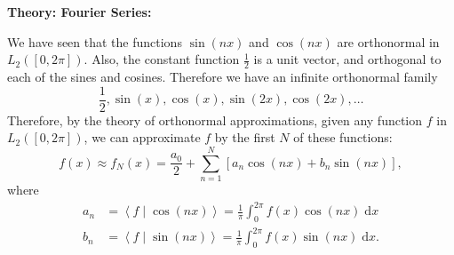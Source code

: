 \documentclass{article}
\newcommand{\diff}{\;\mathrm{d}}
\newcommand{\braket}[2]{\left\langle #1 \mid #2 \right\rangle}
\begin{document}
\begin{center}
\end{center}






\clearpage















\textbf{Theory: Fourier Series:}

\bigskip



We have seen that the functions $\sin(nx)$ and $\cos(nx)$ are orthonormal in $L_2([0,2\pi])$. Also, the constant function $\frac{1}{2}$ is a unit vector, and orthogonal to each of the sines and cosines. Therefore we have an infinite orthonormal family
\[\frac{1}{2},\sin(x),\cos(x),\sin(2x),\cos(2x),\hdots\]
Therefore, by the theory of orthonormal approximations, given any function $f$ in $L_2([0,2\pi])$, we can approximate $f$ by the first $N$ of these functions:
\[f(x)\approx f_N(x)=\frac{a_0}{2}+\sum_{n=1}^N \left[a_n\cos(nx)+b_n\sin(nx)\right],\]
where
\begin{align*}
	a_n&=\braket{f}{\cos(nx)}=\frac{1}{\pi}\int_0^{2\pi} f(x)\cos(nx)\diff x\\
	b_n &= \braket{f}{\sin(nx)}=\frac{1}{\pi}\int_0^{2\pi} f(x)\sin(nx)\diff x.
\end{align*}
\end{document}
